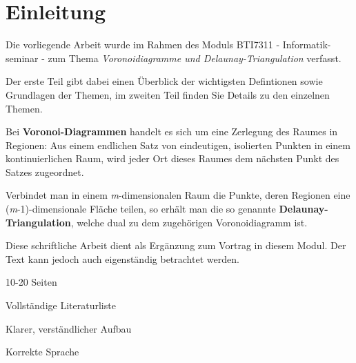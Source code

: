 \section{Einleitung}
Die vorliegende Arbeit wurde im Rahmen des Moduls BTI7311 - Informatik-\\
seminar - zum Thema \textit{Voronoidiagramme und Delaunay-Triangulation} verfasst.


Der erste Teil gibt dabei einen Überblick der wichtigsten Defintionen sowie Grundlagen der Themen, 
im zweiten Teil finden Sie Details zu den einzelnen Themen.

Bei \textbf{Voronoi-Diagrammen} handelt es sich um eine Zerlegung des Raumes in Regionen: Aus einem endlichen Satz von eindeutigen, isolierten Punkten in einem kontinuierlichen Raum,
wird jeder Ort dieses Raumes dem nächsten Punkt des Satzes zugeordnet.

Verbindet man in einem \textit{m}-dimensionalen Raum die Punkte, deren Regionen eine (\textit{m}-1)-dimensionale Fläche teilen, so erhält man die so genannte \textbf{Delaunay-Triangulation},
welche dual zu dem zugehörigen Voronoidiagramm ist.

Diese schriftliche Arbeit dient als Ergänzung zum Vortrag in diesem Modul.
Der Text kann jedoch auch eigenständig betrachtet werden.

\noindent [TODO:]
\begin{compactitem}
	\item 10-20 Seiten
	\item Vollständige Literaturliste
	\item Klarer, verständlicher Aufbau
	\item Korrekte Sprache
\end{compactitem}
